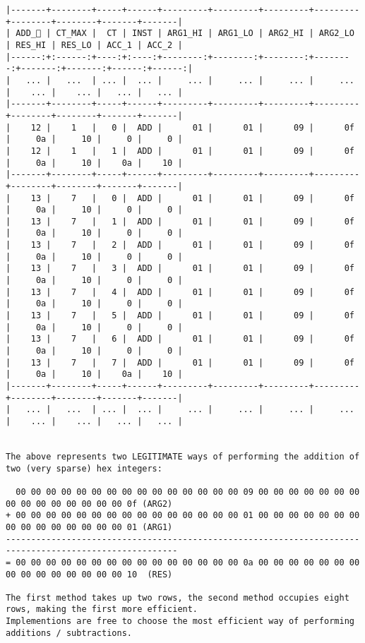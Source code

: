 \documentclass[varwidth=\maxdimen,margin=0.5cm,multi={verbatim}]{standalone}
\begin{document}
\begin{verbatim}
|-------+--------+-----+------+---------+---------+---------+---------+--------+--------+-------+-------|
| ADD_ | CT_MAX |  CT | INST | ARG1_HI | ARG1_LO | ARG2_HI | ARG2_LO | RES_HI | RES_LO | ACC_1 | ACC_2 |
|------:+:------:+----:+:----:+--------:+--------:+--------:+--------:+-------:+-------:+------:+------:|
|   ... |   ...  | ... |  ... |     ... |     ... |     ... |     ... |    ... |    ... |   ... |   ... |
|-------+--------+-----+------+---------+---------+---------+---------+--------+--------+-------+-------|
|    12 |    1   |   0 |  ADD |      01 |      01 |      09 |      0f |     0a |     10 |     0 |     0 |
|    12 |    1   |   1 |  ADD |      01 |      01 |      09 |      0f |     0a |     10 |    0a |    10 |
|-------+--------+-----+------+---------+---------+---------+---------+--------+--------+-------+-------|
|    13 |    7   |   0 |  ADD |      01 |      01 |      09 |      0f |     0a |     10 |     0 |     0 |
|    13 |    7   |   1 |  ADD |      01 |      01 |      09 |      0f |     0a |     10 |     0 |     0 |
|    13 |    7   |   2 |  ADD |      01 |      01 |      09 |      0f |     0a |     10 |     0 |     0 |
|    13 |    7   |   3 |  ADD |      01 |      01 |      09 |      0f |     0a |     10 |     0 |     0 |
|    13 |    7   |   4 |  ADD |      01 |      01 |      09 |      0f |     0a |     10 |     0 |     0 |
|    13 |    7   |   5 |  ADD |      01 |      01 |      09 |      0f |     0a |     10 |     0 |     0 |
|    13 |    7   |   6 |  ADD |      01 |      01 |      09 |      0f |     0a |     10 |     0 |     0 |
|    13 |    7   |   7 |  ADD |      01 |      01 |      09 |      0f |     0a |     10 |    0a |    10 |
|-------+--------+-----+------+---------+---------+---------+---------+--------+--------+-------+-------|
|   ... |   ...  | ... |  ... |     ... |     ... |     ... |     ... |    ... |    ... |   ... |   ... |


The above represents two LEGITIMATE ways of performing the addition of two (very sparse) hex integers:

  00 00 00 00 00 00 00 00 00 00 00 00 00 00 00 09 00 00 00 00 00 00 00 00 00 00 00 00 00 00 00 0f (ARG2)
+ 00 00 00 00 00 00 00 00 00 00 00 00 00 00 00 01 00 00 00 00 00 00 00 00 00 00 00 00 00 00 00 01 (ARG1)
--------------------------------------------------------------------------------------------------------
= 00 00 00 00 00 00 00 00 00 00 00 00 00 00 00 0a 00 00 00 00 00 00 00 00 00 00 00 00 00 00 00 10  (RES) 

The first method takes up two rows, the second method occupies eight rows, making the first more efficient.
Implementions are free to choose the most efficient way of performing additions / subtractions. 
\end{verbatim}
\end{document}
